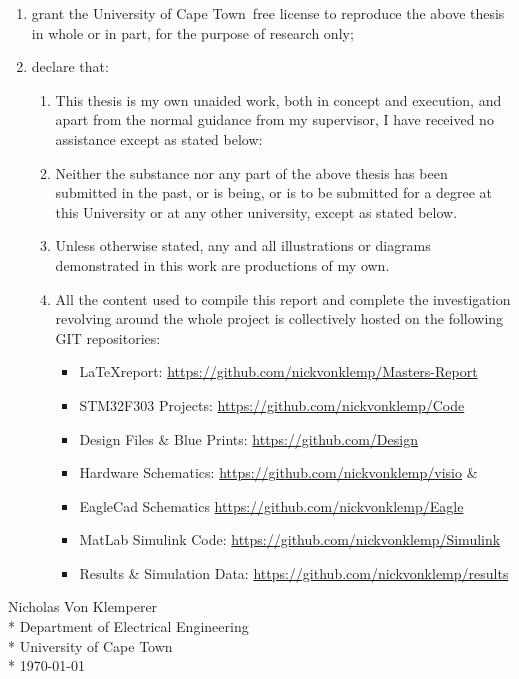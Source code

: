 \documentclass[a4paper, 11pt, oneside, openright, parskip=full]{book}
\newcommand{\auth}{Nicholas Von Klemperer}								%
\newcommand{\dept}{Department of Electrical Engineering}%
\newcommand{\uni}{University of Cape Town}				%
\newcommand*{\signature}[1]
{
	\par\noindent\makebox [5cm]{\hrulefill}
	\par\noindent\makebox [5cm][1]{#1}
}
\begin{document}
\begin{enumerate}
	\item		grant the \uni\  free license to reproduce the above thesis in whole or in part, for the purpose of research only;
	\item		declare that:
	
	\begin{enumerate}
		\item		This thesis is my own unaided work, both in concept and execution, and apart from the normal guidance from my supervisor, I have received no assistance except as stated below:
		\item		Neither the substance nor any part of the above thesis has been submitted in the past, or is being, or is to be submitted for a degree at this University or at any other university, except as stated below.
		\item		Unless otherwise stated, any and all illustrations or diagrams demonstrated in this work are productions of my own.
		\item 		All the content used to compile this report and complete the investigation revolving around the whole project is collectively hosted on the following GIT repositories:
		\begin{itemize}
			\item \LaTeX report: \url{https://github.com/nickvonklemp/Masters-Report}
			\item STM32F303 Projects: \url{https://github.com/nickvonklemp/Code}
			\item Design Files \& Blue Prints: \url{https://github.com/Design}
			\item Hardware Schematics: \url{https://github.com/nickvonklemp/visio} \&
			\item EagleCad Schematics \url{https://github.com/nickvonklemp/Eagle}
			\item MatLab Simulink Code: \url{https://github.com/nickvonklemp/Simulink}
			\item Results \& Simulation Data: \url{https://github.com/nickvonklemp/results}
		\end{itemize}
	\end{enumerate}	
\end{enumerate}

\begin{flushright}	%
	\vskip 4cm
	\noindent \signature{x}
	\noindent \auth \\*
	\vskip 2mm
	\noindent \dept \\*
	\noindent \uni \\*
	\vskip 2mm
	\noindent \today
\end{flushright}
\end{document}
